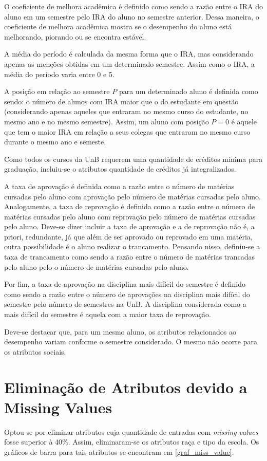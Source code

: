 \par O coeficiente de melhora acadêmica é definido como sendo a razão entre o IRA do
aluno em um semestre pelo IRA do aluno no semestre anterior. Dessa maneira, o
coeficiente de melhora acadêmica mostra se o desempenho do aluno está
melhorando, piorando ou se encontra estável.  
\par A média do período é calculada da mesma forma que o IRA, mas considerando apenas
as menções obtidas em um determinado semestre. Assim como o IRA, a média do período
varia entre 0 e 5.
\par A posição em relação ao semestre $P$ para um determinado aluno é definida como sendo:
o número de alunos com IRA maior que o do estudante em questão
(considerando apenas aqueles que entraram no mesmo curso do estudante, no mesmo ano e
no mesmo semestre). Assim, um aluno com posição $P = 0$ é aquele que tem o maior
IRA em relação a seus colegas que entraram no mesmo curso durante o mesmo ano e
semeste.  
\par Como todos os cursos da UnB requerem uma quantidade de créditos mínima para
graduação, incluiu-se o atributos quantidade de créditos já integralizados. 
\par A taxa de aprovação é definida como a razão entre o número de matérias cursadas
pelo aluno com aprovação pelo número de matérias cursadas pelo aluno. Analogamente, a
taxa de reprovação é definida como a razão entre o número de matérias cursadas pelo
aluno com reprovação pelo número de matérias cursadas pelo aluno. Deve-se dizer
incluir a taxa de aprovação e a de reprovação não é, a priori, redundante, já que
além de ser aprovado ou reprovado em uma matéria, outra possibilidade é o aluno
realizar o trancamento.  Pensando nisso, definiu-se a taxa de trancamento como sendo
a razão entre o número de matérias trancadas pelo aluno pelo o número de matérias
cursadas pelo aluno.
\par Por fim, a taxa de aprovação na disciplina mais difícil do semestre é definido
como sendo a razão entre o número de aprovações na disciplina mais difícil do
semestre pelo número de semestres na UnB. A disciplina considerada como a mais
difícil do semestre é aquela com a maior taxa de reprovação. 
\par Deve-se destacar que, para um mesmo aluno, os atributos relacionados ao
desempenho variam conforme o semestre considerado. O mesmo não ocorre para os
atributos sociais. 

\section{Eliminação de Atributos devido a Missing Values}
Optou-se por eliminar atributos cuja quantidade de entradas com \textit{missing
values} fosse superior à 40\%. Assim, eliminaram-se os atributos raça e tipo da
escola. Os gráficos de barra para tais atributos se encontram em
\ref{graf_miss_value}.

